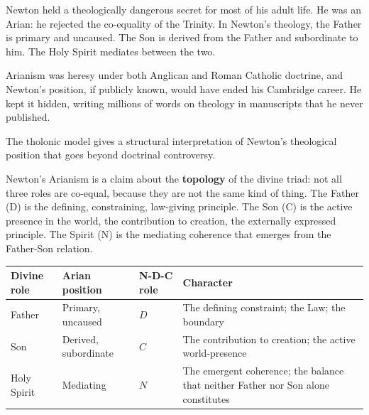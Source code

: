 \documentclass[12pt]{article}
\begin{document}
Newton held a theologically dangerous secret for most of his adult life.
He was an Arian: he rejected the co-equality of the Trinity. In Newton's
theology, the Father is primary and uncaused. The Son is derived from
the Father and subordinate to him. The Holy Spirit mediates between the
two.

Arianism was heresy under both Anglican and Roman Catholic doctrine, and
Newton's position, if publicly known, would have ended his Cambridge
career. He kept it hidden, writing millions of words on theology in
manuscripts that he never published.

The tholonic model gives a structural interpretation of Newton's
theological position that goes beyond doctrinal controversy.

Newton's Arianism is a claim about the \textbf{topology} of the divine
triad: not all three roles are co-equal, because they are not the same
kind of thing. The Father (D) is the defining, constraining, law-giving
principle. The Son (C) is the active presence in the world, the
contribution to creation, the externally expressed principle. The Spirit
(N) is the mediating coherence that emerges from the Father-Son
relation.

\begin{longtable}[]{@{}
  >{\raggedright\arraybackslash}p{}
  >{\raggedright\arraybackslash}p{}
  >{\raggedright\arraybackslash}p{}
  >{\raggedright\arraybackslash}p{}@{}}
\toprule\noalign{}
\begin{minipage}[b]{\linewidth}\raggedright
Divine role
\end{minipage} & \begin{minipage}[b]{\linewidth}\raggedright
Arian position
\end{minipage} & \begin{minipage}[b]{\linewidth}\raggedright
N-D-C role
\end{minipage} & \begin{minipage}[b]{\linewidth}\raggedright
Character
\end{minipage} \\
\midrule\noalign{}
\endhead
\bottomrule\noalign{}
\endlastfoot
Father & Primary, uncaused & \(D\) & The defining constraint; the Law;
the boundary \\
Son & Derived, subordinate & \(C\) & The contribution to creation; the
active world-presence \\
Holy Spirit & Mediating & \(N\) & The emergent coherence; the balance
that neither Father nor Son alone constitutes \\
\end{longtable}
\end{document}
